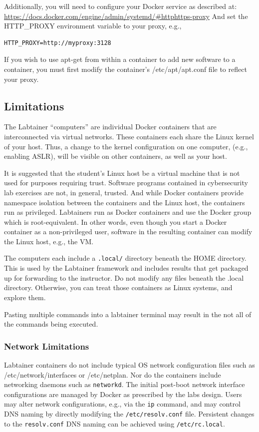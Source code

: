 \documentclass[12pt]{article}
\begin{document}
Additionally, you will need to configure your Docker service as described at:
\url{https://docs.docker.com/engine/admin/systemd/#httphttps-proxy}
And set the HTTP\_PROXY environment variable to your proxy, e.g., 
\begin{verbatim}
HTTP_PROXY=http://myproxy:3128
\end{verbatim}
If you wish to use apt-get from within a container to add new software to a container, you
must first modify the container's /etc/apt/apt.conf file to reflect your proxy.

\subsection{Limitations}
The Labtainer ``computers'' are individual Docker containers that are interconnected via virtual
networks.  These containers each share the Linux kernel of your host.  Thus, a change
to the kernel configuration on one computer, (e.g., enabling ASLR), will be visible on
other containers, as well as your host.

It is suggested that the student's Linux host be a virtual machine that is
not used for purposes requiring trust.  Software programs contained in cybersecurity lab
exercises are not, in general, trusted.  And while Docker containers provide namespace
isolation between the containers and the Linux host, the containers run as privileged.
Labtainers run as Docker containers and use the Docker group 
which is root-equivalent.  In other words, even though you start a Docker container
as a non-privileged user, software in the resulting container can modify the Linux host,
e.g., the VM.

The computers each include a {\tt .local/} directory beneath the HOME directory.  This is used
by the Labtainer framework and includes results that get packaged up for forwarding to the
instructor.  Do not modify any files beneath the .local directory.  Otherwise, you can treat
those containers as Linux systems, and explore them.

Pasting multiple commands into a labtainer terminal may result in the not all of the
commands being executed.

\subsubsection{Network Limitations}
Labtainer containers do not include typical OS network configuration files such as /etc/network/interfaces
or /etc/netplan.  Nor do the containers include networking daemons such as {\tt networkd}.  The initial post-boot network interface
configurations are managed by Docker as prescribed by the labs design.  Users may alter network configurations, e.g., 
via the {\tt ip} command, and may control DNS naming by directly modifying the {\tt /etc/resolv.conf} file.  Persistent
changes to the {\tt resolv.conf} DNS naming can be achieved using {\tt /etc/rc.local}.
\end{document}
